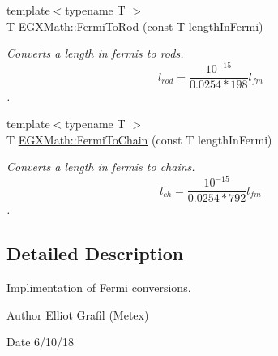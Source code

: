 \begin{DoxyCompactItemize}
{\footnotesize template$<$typename T $>$ }\\T \mbox{\hyperlink{group___e_g_x_math-_conversions-_length_conversions-_non-_s_i-_fermi-_surveyors_ga45d5bb796dd61d3b2f81d45dafbc682d}{E\+G\+X\+Math\+::\+Fermi\+To\+Rod}} (const T length\+In\+Fermi)
\begin{DoxyCompactList}\small\item\em Converts a length in fermis to rods. \[ l_{rod}= \frac{10^{-15}}{0.0254 * 198} l_{fm} \]. \end{DoxyCompactList}\item 
{\footnotesize template$<$typename T $>$ }\\T \mbox{\hyperlink{group___e_g_x_math-_conversions-_length_conversions-_non-_s_i-_fermi-_surveyors_ga0c8f626fae443871df52f72a4b361a60}{E\+G\+X\+Math\+::\+Fermi\+To\+Chain}} (const T length\+In\+Fermi)
\begin{DoxyCompactList}\small\item\em Converts a length in fermis to chains. \[ l_{ch}= \frac{10^{-15}}{0.0254 * 792} l_{fm} \]. \end{DoxyCompactList}\end{DoxyCompactItemize}


\subsection{Detailed Description}
Implimentation of Fermi conversions. 

\begin{DoxyAuthor}{Author}
Elliot Grafil (Metex) 
\end{DoxyAuthor}
\begin{DoxyDate}{Date}
6/10/18 
\end{DoxyDate}
